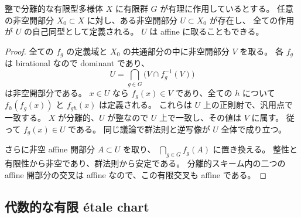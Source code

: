 \begin{lemma}[有限な有理作用を正則にする安定開部分]
\label{lem:finite-birational-stable-open}
整で分離的な有限型多様体 $X$ に有限群 $G$ が有理に作用しているとする。
任意の非空開部分 $X_0\subset X$ に対し、ある非空開部分 $U\subset X_0$ が存在し、
全ての作用が $U$ の自己同型として定義される。
$U$ は affine に取ることもできる。
\end{lemma}
\begin{proof}
全ての $f_g$ の定義域と $X_0$ の共通部分の中に非空開部分 $V$ を取る。
各 $f_g$ は birational なので dominant であり、
\begin{equation}\label{eq:finite-stable-open-construction}
 U=\bigcap_{g\in G}\bigl(V\cap f_g^{-1}(V)\bigr)
\end{equation}
は非空開部分である。
$x\in U$ なら $f_g(x)\in V$ であり、全ての $h$ について
$f_h(f_g(x))$ と $f_{gh}(x)$ は定義される。
これらは $U$ 上の正則射で、汎用点で一致する。
$X$ が分離的、$U$ が整なので $U$ 上で一致し、その値は $V$ に属す。
従って $f_g(x)\in U$ である。
同じ議論で群法則と逆写像が $U$ 全体で成り立つ。

さらに非空 affine 開部分 $A\subset U$ を取り、
$\bigcap_{g\in G} f_g(A)$ に置き換える。
整性と有限性から非空であり、群法則から安定である。
分離的スキーム内の二つの affine 開部分の交叉は affine なので、この有限交叉も affine である。
\end{proof}

\subsection{代数的な有限 \'etale chart}


